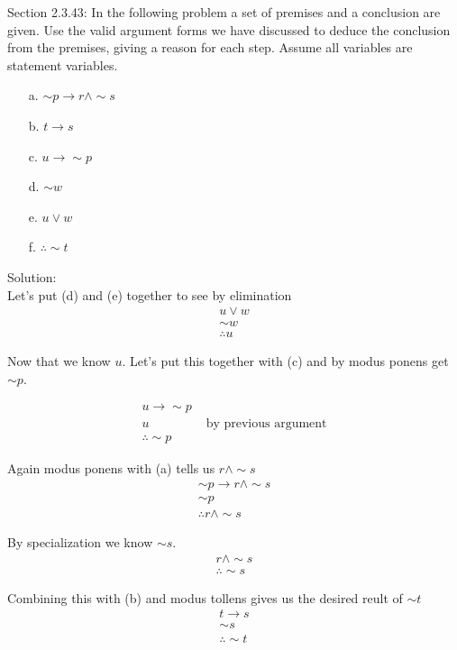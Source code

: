 \documentclass[10 pt]{amsart}
\theoremstyle{definition}
\theoremstyle{remark}
\numberwithin{equation}{subsection}
\begin{document}
\newpage

Section 2.3.43: In the following problem a set of premises and a conclusion are given.  Use the valid argument forms we have discussed to deduce the conclusion from the premises, giving a reason for each step.  Assume all variables are statement variables.\\

\begin{enumerate}
\item[a.] $\sim p \rightarrow r \wedge \sim s$\\
\item[b.] $t \rightarrow s$\\
\item[c.] $u\rightarrow \sim p$\\
\item[d.] $\sim w$\\
\item[e.] $u\vee w$\\
\item[f.] $\therefore \sim t$\\
\end{enumerate}


Solution:\\
Let's put (d) and (e) together to see by elimination
\begin{eqnarray*}
u\vee w\\
\sim w\\
\therefore u
\end{eqnarray*}

Now that we know $u$.  Let's put this together with (c) and by modus ponens get $\sim p$.

\begin{eqnarray*}
u \rightarrow \sim p &\\
u &\text{ by previous argument}\\
\therefore \sim p &
\end{eqnarray*}

Again modus ponens with (a) tells us $r\wedge \sim s$
\begin{eqnarray*}
\sim p\rightarrow r\wedge \sim s\\
\sim p\\
\therefore r\wedge \sim s
\end{eqnarray*}

By specialization we know $\sim s$.
\begin{eqnarray*}
r\wedge \sim s\\
\therefore \sim s
\end{eqnarray*}

Combining this with (b) and modus tollens gives us the desired reult of $\sim t$
\begin{eqnarray*}
t\rightarrow s\\
\sim s\\
\therefore \sim t
\end{eqnarray*}
\end{document}
